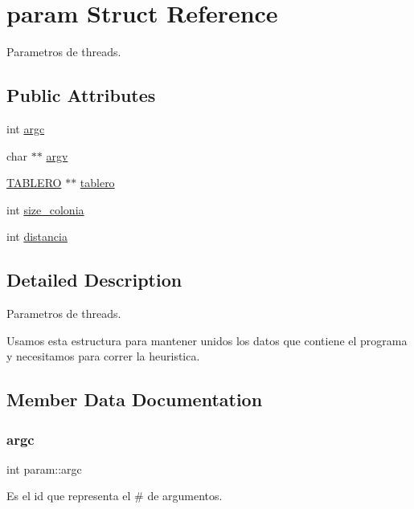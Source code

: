 \hypertarget{structparam}{}\section{param Struct Reference}
\label{structparam}


Parametros de threads.  


\subsection*{Public Attributes}
\begin{DoxyCompactItemize}
\item 
int \hyperlink{structparam_a7751b76e002be1f58fd5fdc4291debe6}{argc}
\item 
char $\ast$$\ast$ \hyperlink{structparam_a926bb744271039e8d0ebce5402f0f7d1}{argv}
\item 
\hyperlink{tablero_8h_acbb1e9c862ccf810af77512ddb019a82}{T\+A\+B\+L\+E\+RO} $\ast$$\ast$ \hyperlink{structparam_ad395dc2901b31a672cfa266253a8694f}{tablero}
\item 
int \hyperlink{structparam_a461fac084fae7d26b6e687fee5d2966f}{size\+\_\+colonia}
\item 
int \hyperlink{structparam_a9a96bac8d4ffd9c6873a2d5a194b9240}{distancia}
\end{DoxyCompactItemize}


\subsection{Detailed Description}
Parametros de threads. 

Usamos esta estructura para mantener unidos los datos que contiene el programa y necesitamos para correr la heuristica. 

\subsection{Member Data Documentation}
\mbox{\label{structparam_a7751b76e002be1f58fd5fdc4291debe6}} 
\subsubsection{\texorpdfstring{argc}{argc}}
{\footnotesize\ttfamily int param\+::argc}

Es el id que representa el \# de argumentos. \mbox{\label{structparam_a926bb744271039e8d0ebce5402f0f7d1}} 
